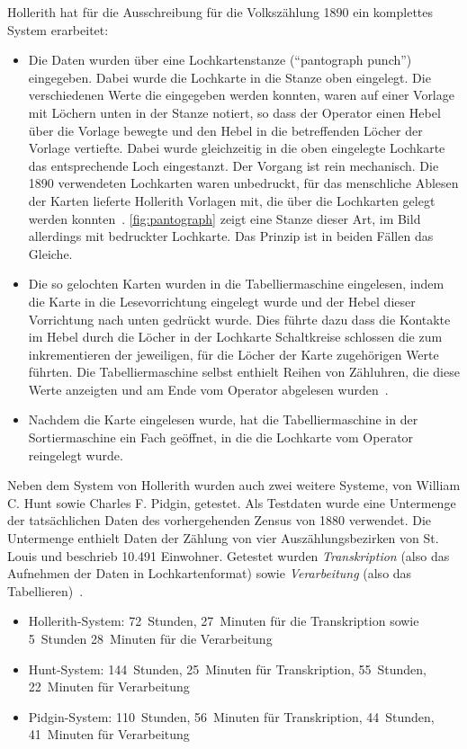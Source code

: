 \documentclass[parskip=half]{scrartcl}
\begin{document}
Hollerith hat für die Ausschreibung für die Volkszählung 1890 ein komplettes
System erarbeitet:

\begin{itemize}
  \item Die Daten wurden über eine Lochkartenstanze (\enquote{pantograph punch})
    eingegeben. Dabei wurde
    die Lochkarte in die Stanze oben eingelegt. Die verschiedenen Werte die
    eingegeben werden konnten, waren auf einer Vorlage mit Löchern unten in
    der Stanze notiert, so dass der Operator einen Hebel über die Vorlage
    bewegte und den Hebel in die betreffenden Löcher der Vorlage vertiefte.
    Dabei wurde gleichzeitig in die oben eingelegte Lochkarte das entsprechende
    Loch eingestanzt. Der Vorgang ist rein mechanisch. Die 1890 verwendeten
    Lochkarten waren unbedruckt, für das menschliche Ablesen der Karten
    lieferte Hollerith Vorlagen mit, die über die Lochkarten gelegt werden
    konnten~\cite{austrian1982herman}. \autoref{fig:pantograph} zeigt eine
    Stanze dieser Art, im Bild allerdings mit bedruckter Lochkarte. Das
    Prinzip ist in beiden Fällen das Gleiche.
  \item Die so gelochten Karten wurden in die Tabelliermaschine eingelesen,
    indem die Karte in die Lesevorrichtung eingelegt wurde und der Hebel dieser
    Vorrichtung nach unten gedrückt wurde. Dies führte dazu dass die Kontakte
    im Hebel durch die Löcher in der Lochkarte Schaltkreise schlossen die zum
    inkrementieren der jeweiligen, für die Löcher der Karte zugehörigen Werte
    führten. Die Tabelliermaschine selbst enthielt Reihen von Zähluhren, die
    diese Werte anzeigten und am Ende vom Operator abgelesen
    wurden~\cite{deutschesMuseum}.
  \item Nachdem die Karte eingelesen wurde, hat die Tabelliermaschine in der
    Sortiermaschine ein Fach geöffnet, in die die Lochkarte vom Operator
    reingelegt wurde.
\end{itemize}

Neben dem System von Hollerith wurden auch zwei weitere Systeme, von William C.
Hunt sowie Charles F. Pidgin, getestet. Als Testdaten wurde eine Untermenge der
tatsächlichen Daten des vorhergehenden Zensus von 1880 verwendet. Die
Untermenge enthielt Daten der Zählung von vier Auszählungsbezirken von St.
Louis und beschrieb 10.491 Einwohner. Getestet wurden \emph{Transkription}
(also das Aufnehmen der Daten in Lochkartenformat) sowie \emph{Verarbeitung}
(also das Tabellieren)~\cite{austrian1982herman}.

\begin{itemize}
  \item Hollerith-System: 72~Stunden, 27~Minuten für die Transkription sowie
    5~Stunden 28~Minuten für die Verarbeitung
  \item Hunt-System: 144~Stunden, 25~Minuten für Transkription, 55~Stunden,
    22~Minuten für Verarbeitung
  \item Pidgin-System: 110~Stunden, 56~Minuten für Transkription,
    44~Stunden, 41~Minuten für Verarbeitung
\end{itemize}
\end{document}
